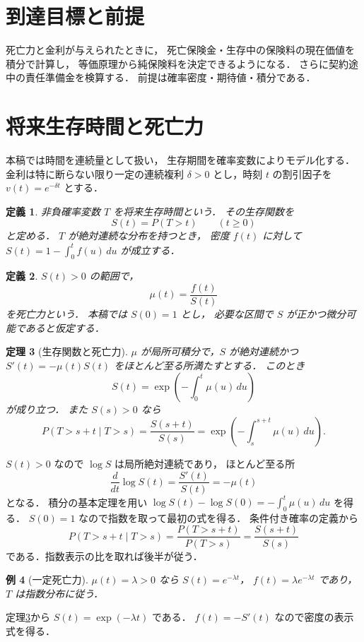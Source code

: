 \documentclass[a5paper,10pt,onecolumn]{jsarticle}
\makeatletter
\theoremstyle{mathnotetheorem}
\newtheorem{theorem}{定理}[section]
\newtheorem{definition}[theorem]{定義}
\newtheorem{example}[theorem]{例}
\renewcommand{\proofname}{証明}
\renewenvironment{proof}[1][\proofname]{%
  \par\pushQED{\qed}\normalfont\topsep4\p@\@plus2\p@\relax
  \trivlist\item[\hskip\labelsep\bfseries #1]\ignorespaces
}{\popQED\endtrivlist\@endpefalse}
\makeatother
\begin{document}
\section*{到達目標と前提}
死亡力と金利が与えられたときに，
死亡保険金・生存中の保険料の現在価値を積分で計算し，
等価原理から純保険料を決定できるようになる．
さらに契約途中の責任準備金を検算する．
前提は確率密度・期待値・積分である．

\section{将来生存時間と死亡力}

本稿では時間を連続量として扱い，
生存期間を確率変数によりモデル化する．
金利は特に断らない限り一定の連続複利
$\delta>0$ とし，時刻 $t$ の割引因子を
$v(t)=e^{-\delta t}$ とする．

\begin{definition}
非負確率変数 $T$ を将来生存時間という．
その\emph{生存関数}を
\[
 S(t)=P(T>t)\qquad(t\ge0)
\]
と定める．
$T$ が絶対連続な分布を持つとき，
密度 $f(t)$ に対して
$S(t)=1-\int_0^t f(u)\,du$ が成立する．
\end{definition}

\begin{definition}
$S(t)>0$ の範囲で，
\[
 \mu(t)=\frac{f(t)}{S(t)}
\]
を\emph{死亡力}という．
本稿では $S(0)=1$ とし，
必要な区間で $S$ が正かつ微分可能であると仮定する．
\end{definition}

\begin{theorem}[生存関数と死亡力]\label{thm:force}
$\mu$ が局所可積分で，$S$ が絶対連続かつ
$S'(t)=-\mu(t)S(t)$ をほとんど至る所満たすとする．
このとき
\[
 S(t)=\exp\!\left(-\int_0^t\mu(u)\,du\right)
\]
が成り立つ．
また $S(s)>0$ なら
\[
 P(T>s+t\mid T>s)=\frac{S(s+t)}{S(s)}
 =\exp\!\left(-\int_s^{s+t}\mu(u)\,du\right).
\]
\end{theorem}
\begin{proof}
$S(t)>0$ なので $\log S$ は局所絶対連続であり，
ほとんど至る所
\[
 \frac d{dt}\log S(t)=\frac{S'(t)}{S(t)}=-\mu(t)
\]
となる．
積分の基本定理を用い
$\log S(t)-\log S(0)=-\int_0^t\mu(u)\,du$ を得る．
$S(0)=1$ なので指数を取って最初の式を得る．
条件付き確率の定義から
\[
 P(T>s+t\mid T>s)
 =\frac{P(T>s+t)}{P(T>s)}
 =\frac{S(s+t)}{S(s)}
\]
である．指数表示の比を取れば後半が従う．
\end{proof}

\begin{example}[一定死亡力]
$\mu(t)=\lambda>0$ なら
$S(t)=e^{-\lambda t}$，
$f(t)=\lambda e^{-\lambda t}$ であり，
$T$ は指数分布に従う．
\end{example}
\begin{proof}
定理\ref{thm:force}から
$S(t)=\exp(-\lambda t)$ である．
$f(t)=-S'(t)$ なので密度の表示式を得る．
\end{proof}
\end{document}

